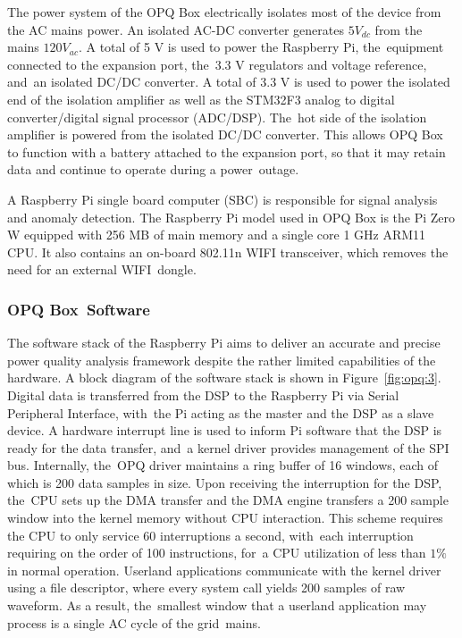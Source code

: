 \documentclass[energies,article,accept,moreauthors,pdftex]{Definitions/mdpi}
\begin{document}
The power system of the OPQ Box electrically isolates most of the device from the AC mains power.
An isolated AC-DC converter generates $5V_{dc}$ from the mains $120V_{ac}$.
A total of 5 V is used to power the Raspberry Pi, the~equipment connected to the expansion port, the~3.3 V regulators and voltage reference, and~an isolated DC/DC converter.
A total of 3.3 V is used to power the isolated end of the isolation amplifier as well as the STM32F3 analog to digital converter/digital signal processor (ADC/DSP).
The~hot side of the isolation amplifier is powered from the isolated DC/DC converter.
This allows OPQ Box to function with a battery attached to the expansion port, so that it may retain data and continue to operate during a power~outage.




A Raspberry Pi single board computer (SBC) is responsible for signal analysis and anomaly detection.
The Raspberry Pi model used in OPQ Box is the Pi Zero W equipped with 256 MB of main memory and a single core 1 GHz ARM11 CPU. It also contains an on-board 802.11n WIFI transceiver, which removes the need for an external WIFI~dongle.

\subsubsection{OPQ Box~Software}\label{subsec:software}

The software stack of the Raspberry Pi aims to deliver an accurate and precise power quality analysis framework despite the rather limited capabilities of the hardware.
A block diagram of the software stack is shown in Figure~\ref{fig:opq:3}.
Digital data is transferred from the DSP to the Raspberry Pi via Serial Peripheral Interface, with~the Pi acting as the master and the DSP as a slave device.
A hardware interrupt line is used to inform Pi software that the DSP is ready for the data transfer, and~a kernel driver provides management of the SPI bus.
Internally, the~OPQ driver maintains a ring buffer of 16 windows, each of which is 200 data samples in size.
Upon receiving the interruption for the DSP, the~CPU sets up the DMA transfer and the DMA engine transfers a 200 sample window into the kernel memory without CPU interaction.
This scheme requires the CPU to only service 60 interruptions a second, with~each interruption requiring on the order of 100 instructions, for~a CPU utilization of less than $1\%$ in normal operation.
Userland applications communicate with the kernel driver using a file descriptor, where every 
 system call yields 200 samples of raw waveform.
As a result, the~smallest window that a userland application may process is a single AC cycle of the grid~mains.
\end{document}
